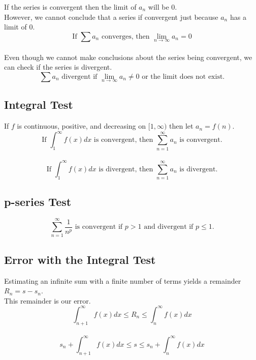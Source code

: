 \documentclass[12pt]{article}
\begin{document}
If the series is convergent then the limit of $a_n$ will be 0.\\
However, we cannot conclude that a series if convergent just because $a_n$ has a limit of 0.\\
\begin{displaymath}
\text{If }\sum a_n\text{ converges, then }\lim_{n\to\infty} a_n = 0
\end{displaymath}
\\
Even though we cannot make conclusions about the series being convergent, we can check if the series is divergent.\\
\begin{displaymath}
\sum a_n\text{ divergent if }\lim_{n\to\infty} a_n \neq 0\text{ or the limit does not exist.}
\end{displaymath}


\subsection{Integral Test}

If $f$ is continuous, positive, and decreasing on $[1, \infty)$ then let $a_n = f(n)$.\\
\begin{displaymath}
\text{If }\int_{1}^{\infty} f(x)dx\text{ is convergent, then }\sum_{n=1}^{\infty} a_n\text{ is convergent.}
\end{displaymath}
\\
\begin{displaymath}
\text{If }\int_{1}^{\infty} f(x)dx\text{ is divergent, then }\sum_{n=1}^{\infty} a_n\text{ is divergent.}
\end{displaymath}


\subsection{p-series Test}

\begin{displaymath}
\sum_{n=1}^{\infty} \frac{1}{n^p}\text{ is convergent if }p > 1\text{ and divergent if }p \leq 1\text{.}
\end{displaymath}


\subsection{Error with the Integral Test}

Estimating an infinite sum with a finite number of terms yields a remainder $R_n = s - s_n$.\\
This remainder is our error.\\
\begin{displaymath}
\int_{n+1}^{\infty} f(x)dx \leq R_n \leq \int_{n}^{\infty} f(x)dx
\end{displaymath}
\\
\begin{displaymath}
s_n + \int_{n+1}^{\infty} f(x)dx \leq s \leq s_n + \int_{n}^{\infty} f(x)dx
\end{displaymath}
\end{document}
